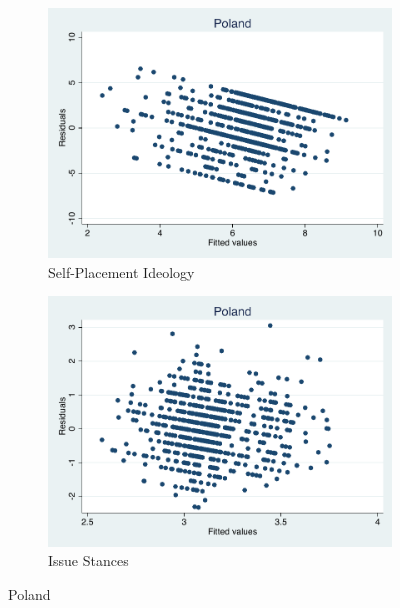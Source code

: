 \documentclass[12pt, titlepage]{article}
\begin{document}
\begin{figure}[H]
	\centering
	\begin{subfigure}[b]{0.475\textwidth}   
		\centering 
		\includegraphics[width=\textwidth]{Residuals/CountryIdeo/Poland}
		\caption{Self-Placement Ideology}
	\end{subfigure}
	\hfill
	\begin{subfigure}[b]{0.475\textwidth}
		\centering 
		\includegraphics[width=\textwidth]{Residuals/CountryLib/Poland}
		\caption{Issue Stances}
	\end{subfigure}
	\caption{Poland}
	\label{Poland}
\end{figure}
\end{document}
